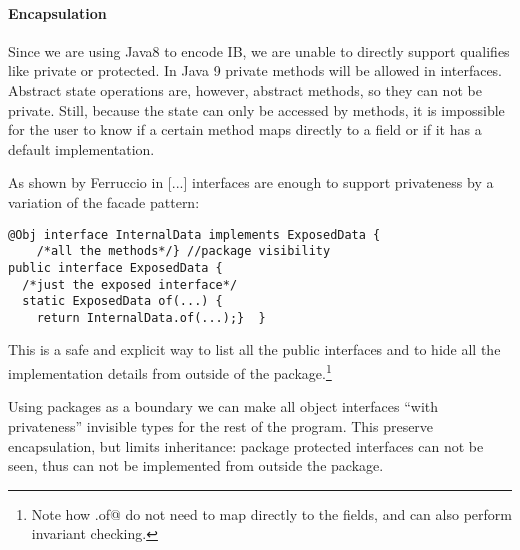 \begin{comment}
@Obj interface Person$ extends Person{//will be further expanded by @Obj
  void name(String val);
  default void rename(String newName){ if(/*valid name*/){ this.name(val);}}
  String name();
  static Person from(String val){ if(/*valid name*/){return Person$.of(val);}
    throw /*invalid name*/}  }
\end{lstlisting}

This is not a perfect solution, since
\Q@Person$@ can still be seen inside the \Q@Person@ package and heirs of
\Q@Person$@,
however it is surprising we achieve such of a good result without any language
support for privacy in interfaces.
\end{comment}

\paragraph{Encapsulation} %
Since we are using Java8 to encode IB, we are unable to directly support qualifies
like private or protected. In Java 9 private methods will be allowed in
interfaces. Abstract state operations are, however, abstract methods,
so they can not be private.
Still, because the state can only be accessed by methods, it
is impossible for the user to know if a certain method maps directly to a field
or if it has a default implementation.

As shown by Ferruccio in [...] interfaces are enough to support privateness by a
 variation of the facade pattern:
\begin{lstlisting}
@Obj interface InternalData implements ExposedData {
    /*all the methods*/} //package visibility
public interface ExposedData {
  /*just the exposed interface*/
  static ExposedData of(...) {
    return InternalData.of(...);}  }
\end{lstlisting}

This is a safe and explicit way to list all the public interfaces and to hide all the implementation
details from outside of the package.\footnote{
Note how \Q@ExposedData.of@ do not need to map directly to the fields, and can also perform
invariant checking.}

Using packages as a boundary we can make all object interfaces ``with privateness''
invisible types for the rest of the program.
This preserve encapsulation, but limits inheritance:
package protected interfaces can not be seen,
thus can not be implemented from outside the package.

